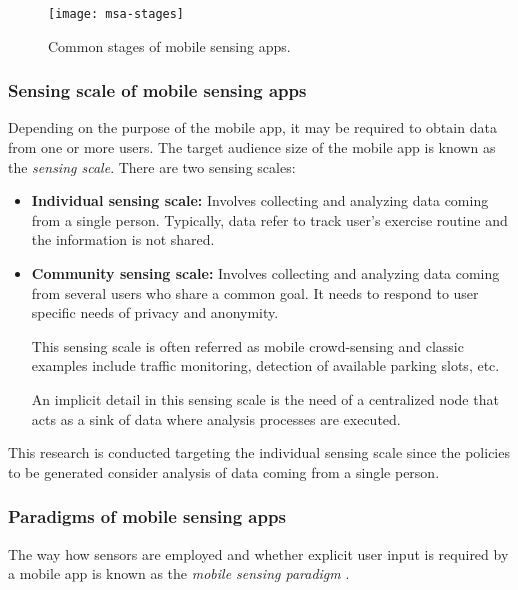 \begin{figure}
\centering
\texttt{[image: msa-stages]}
\caption[Common stages of mobile sensing apps]{Common stages of mobile sensing apps.}
\label{fig-mobile-sensing-apps-stages}
\end{figure}

\subsubsection{Sensing scale of mobile sensing apps}\label{sub:sensing-scale-of-msa}

Depending on the purpose of the mobile app, it may be required to obtain data from one or more users.
The target audience size of the mobile app is known as the \emph{sensing scale}.
There are two sensing scales:
\begin{itemize}
  \item \textbf{Individual sensing scale:} Involves collecting and analyzing data coming from a single person.
  Typically, data refer to track user’s exercise routine and the information is not shared.

  \item \textbf{Community sensing scale:} Involves collecting and analyzing data coming from several users who share a common goal.
  It needs to respond to user specific needs of privacy and anonymity.
  
  This sensing scale is often referred as mobile crowd-sensing and classic examples include traffic monitoring, detection of available parking slots, etc.

  An implicit detail in this sensing scale is the need of a centralized node that acts as a sink of data where analysis processes are executed.
\end{itemize}

This research is conducted targeting the individual sensing scale since the policies to be generated consider analysis of data coming from a single person.


\subsubsection{Paradigms of mobile sensing apps}\label{sub:paradigms-of-msa}

The way how sensors are employed and whether explicit user input is required by a mobile app is known as the \emph{mobile sensing paradigm} \cite{Lane2010}.

